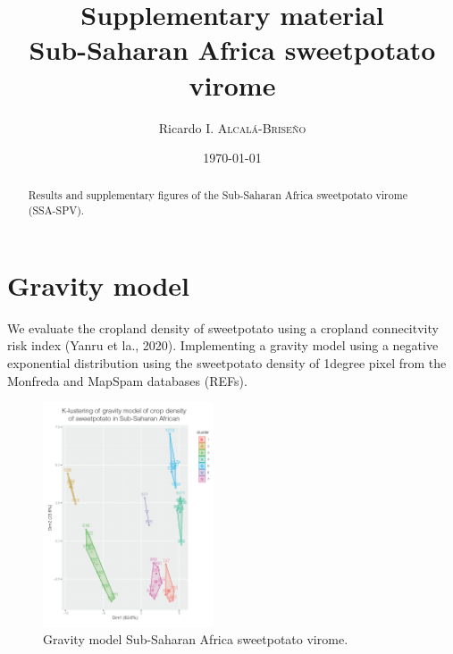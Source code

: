 \documentclass{article}
\title{Supplementary material \\  Sub-Saharan Africa sweetpotato virome } %
\author{Ricardo I. \textsc{Alcal\'a-Brise\~no}} %
\date{\today} %
\begin{document}
\maketitle %

 \begin{abstract}
 Results and supplementary figures of the Sub-Saharan Africa  sweetpotato virome (SSA-SPV).  
 \end{abstract}


\section{Gravity model}

We evaluate the cropland density of sweetpotato using a cropland connecitvity risk index (Yanru et la., 2020). Implementing a gravity model using a negative exponential distribution using the sweetpotato density of 1degree pixel from the Monfreda and MapSpam databases (REFs). 


\begin{figure}[h!]
\begin{center}
\includegraphics[width=0.45\textwidth]{../images/SSA-SPV-kcluster-1gamma-2_deg_1e-06_gap_statsMC1000} %
\caption{Gravity model Sub-Saharan Africa sweetpotato virome.}
\end{center}
\end{figure}

\begin{center}\end{center}
\end{document}

